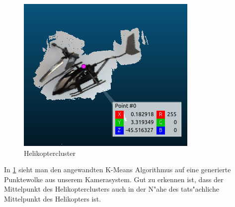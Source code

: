 \begin{figure}[H]
	\includegraphics[scale=0.75]{bilder/helicloud}
	\caption[Helikoptercluster]{Helikoptercluster}
	\label{fig:helimeans}%
\end{figure}

\noindent In \ref{fig:helimeans} sieht man den angewandten K-Means Algorithmus auf eine generierte Punktewolke aus unserem Kamerasystem. Gut zu erkennen ist, dass der Mittelpunkt des Helikopterclusters auch in der N"ahe des tats"achliche Mittelpunkt des Helikopters ist.
